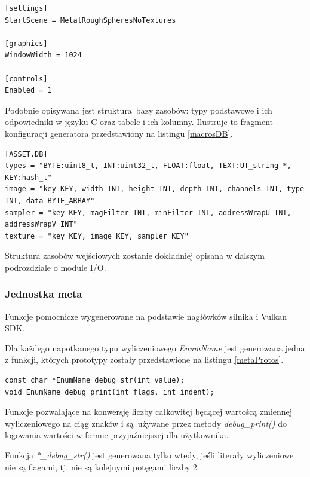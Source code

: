 \lstset{language=verbatim}
\begin{lstlisting}[caption={Przykładowa konfiguracja globalna},captionpos=b,label={macrosAfter}]
[settings]
StartScene = MetalRoughSpheresNoTextures

[graphics]
WindowWidth = 1024

[controls]
Enabled = 1 
\end{lstlisting}

Podobnie opisywana jest struktura bazy zasobów: typy podstawowe i ich odpowiedniki w języku C oraz tabele i ich kolumny. Ilustruje to fragment konfiguracji generatora przedstawiony na listingu \ref{macrosDB}.
\lstset{language=verbatim}
\begin{lstlisting}[caption={Fragment konfiguracji generatora opisujący strukturę bazy zasobów},captionpos=b,label={macrosDB}]
[ASSET.DB]
types = "BYTE:uint8_t, INT:uint32_t, FLOAT:float, TEXT:UT_string *, KEY:hash_t"
image = "key KEY, width INT, height INT, depth INT, channels INT, type INT, data BYTE_ARRAY"
sampler = "key KEY, magFilter INT, minFilter INT, addressWrapU INT, addressWrapV INT"
texture = "key KEY, image KEY, sampler KEY"
\end{lstlisting}

Struktura zasobów wejściowych zostanie dokładniej opisana w dalszym podrozdziale o module I/O.

\subsubsection{Jednostka meta}
Funkcje pomocnicze wygenerowane na podstawie nagłówków silnika i Vulkan SDK.

Dla każdego napotkanego typu wyliczeniowego \textit{EnumName} jest generowana jedna z funkcji, których prototypy zostały przedstawione na listingu \ref{metaProtos}.
\lstset{language=C}
\begin{lstlisting}[caption={Wygenerowane funkcje dla typów wyliczeniowych},captionpos=b,label={metaProtos}]
const char *EnumName_debug_str(int value);
void EnumName_debug_print(int flags, int indent);
\end{lstlisting}
Funkcje pozwalające na konwersję liczby całkowitej będącej wartoścą zmiennej wyliczeniowego na ciąg znaków i są używane przez metody \textit{debug\_print()} do logowania wartości w formie przyjaźniejszej dla użytkownika.

Funkcja \textit{*\_debug\_str()} jest generowana tylko wtedy, jeśli literały wyliczeniowe nie są flagami, tj. nie są kolejnymi potęgami liczby 2.


